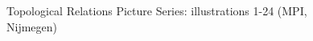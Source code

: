 \begin{figure}
\qquad
{}
\caption[TRPS 1-24]{Topological Relations Picture Series: illustrations 1-24
(\textcopyright MPI, Nijmegen)
  \cite[570-71]{Levi06} \label{fig:TRPS-1-24}}
\end{figure}


